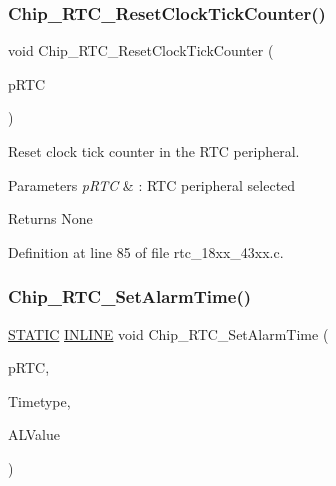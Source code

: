 \subsubsection{\texorpdfstring{Chip\+\_\+\+R\+T\+C\+\_\+\+Reset\+Clock\+Tick\+Counter()}{Chip\_RTC\_ResetClockTickCounter()}}
{\footnotesize\ttfamily void Chip\+\_\+\+R\+T\+C\+\_\+\+Reset\+Clock\+Tick\+Counter (\begin{DoxyParamCaption}\item[{\hyperlink{struct_l_p_c___r_t_c___t}{L\+P\+C\+\_\+\+R\+T\+C\+\_\+T} $\ast$}]{p\+R\+TC }\end{DoxyParamCaption})}



Reset clock tick counter in the R\+TC peripheral. 


\begin{DoxyParams}{Parameters}
{\em p\+R\+TC} & \+: R\+TC peripheral selected \\
\hline
\end{DoxyParams}
\begin{DoxyReturn}{Returns}
None 
\end{DoxyReturn}


Definition at line 85 of file rtc\+\_\+18xx\+\_\+43xx.\+c.

\mbox{\label{group___r_t_c__18_x_x__43_x_x_ga7ac6a9a813f710e8e93c4b598a14a795}} 
\subsubsection{\texorpdfstring{Chip\+\_\+\+R\+T\+C\+\_\+\+Set\+Alarm\+Time()}{Chip\_RTC\_SetAlarmTime()}}
{\footnotesize\ttfamily \hyperlink{group___l_p_c___types___public___macros_ga10b2d890d871e1489bb02b7e70d9bdfb}{S\+T\+A\+T\+IC} \hyperlink{spifi__18xx__43xx_8h_a2eb6f9e0395b47b8d5e3eeae4fe0c116}{I\+N\+L\+I\+NE} void Chip\+\_\+\+R\+T\+C\+\_\+\+Set\+Alarm\+Time (\begin{DoxyParamCaption}\item[{\hyperlink{struct_l_p_c___r_t_c___t}{L\+P\+C\+\_\+\+R\+T\+C\+\_\+T} $\ast$}]{p\+R\+TC,  }\item[{\hyperlink{group___r_t_c__18_x_x__43_x_x_ga8144898fe628404d396db06dc8aac0e0}{R\+T\+C\+\_\+\+T\+I\+M\+E\+I\+N\+D\+E\+X\+\_\+T}}]{Timetype,  }\item[{uint32\+\_\+t}]{A\+L\+Value }\end{DoxyParamCaption})}




